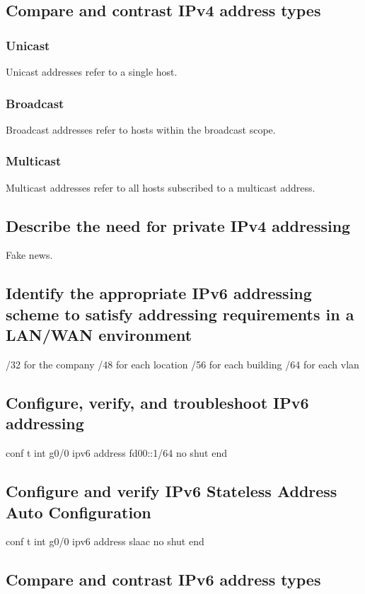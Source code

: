 \documentclass[10pt]{article}
\begin{document}
\subsection{Compare and contrast IPv4 address types}
\subsubsection{Unicast}
Unicast addresses refer to a single host.

\subsubsection{Broadcast}
Broadcast addresses refer to hosts within the broadcast scope.

\subsubsection{Multicast}
Multicast addresses refer to all hosts subscribed to a multicast address.

\subsection{Describe the need for private IPv4 addressing}
Fake news.

\subsection{Identify the appropriate IPv6 addressing scheme to satisfy addressing requirements in a LAN/WAN environment}
/32 for the company
/48 for each location
/56 for each building
/64 for each vlan

\subsection{Configure, verify, and troubleshoot IPv6 addressing}
conf t
int g0/0
ipv6 address fd00::1/64
no shut
end

\subsection{Configure and verify IPv6 Stateless Address Auto Configuration}
conf t
int g0/0
ipv6 address slaac
no shut
end

\subsection{ Compare and contrast IPv6 address types}
\end{document}

